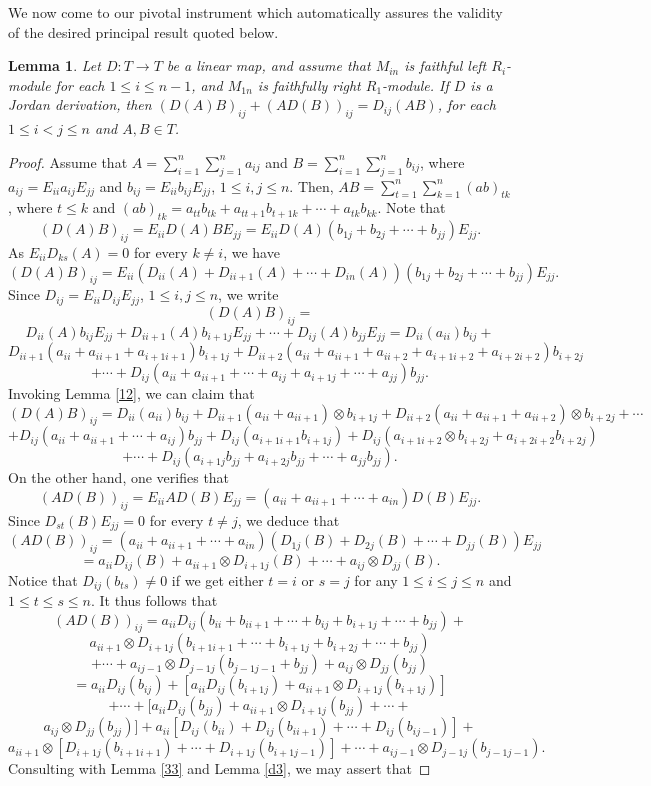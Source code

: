 \documentclass[12pt, reqno]{amsart}
\newtheorem{lemma}[theorem]{Lemma}
\theoremstyle{definition}
\numberwithin{equation}{section}
\begin{document}
We now come to our pivotal instrument which automatically assures the validity of the desired principal result quoted below.

\begin{lemma}\label{major} Let $D : T \longrightarrow T$ be a linear map, and assume that $M_{in}$ is faithful left $R_{i}$-module for each $1\leq i \leq n-1$, and $M_{1n}$ is faithfully right $R_1$-module. If $D$ is a Jordan derivation, then $(D(A)B)_{ij}+(AD(B))_{ij}=D_{ij}(AB)$, for each $1\leq i< j \leq n$ and $A,B\in T$.
\end{lemma}

\begin{proof} Assume that $A=\sum_{i=1}^n\sum_{j=1}^n a_{ij} $ and $B=\sum_{i=1}^n\sum_{j=1}^n b_{ij}$, where $a_{ij}=E_{ii}a_{ij}E_{jj}$ and $b_{ij}=E_{ii}b_{ij}E_{jj}$, $1\leq i,j\leq n$. Then, $AB=\sum_{t=1}^n\sum_{k=1}^n (ab)_{tk} $, where $t\leq k$ and $(ab)_{tk}=a_{tt}b_{tk}+a_{tt+1}b_{t+1k}+\cdots+a_{tk}b_{kk}$. Note that $$(D(A)B)_{ij}=E_{ii}D(A)BE_{jj}=E_{ii}D(A)(b_{1j}+b_{2j}+\cdots+b_{jj})E_{jj}.$$ As $E_{ii}D_{ks}(A)=0$ for every $k\neq i$, we have $$(D(A)B)_{ij}= E_{ii}(D_{ii}(A)+D_{ii+1}(A)+\cdots+D_{in}(A))(b_{1j}+b_{2j}+\cdots+b_{jj})E_{jj}.$$ Since $D_{ij}=E_{ii}D_{ij}E_{jj}$, $1\leq i,j\leq n$, we write $$(D(A)B)_{ij}= $$$$D_{ii}(A)b_{ij}E_{jj}+D_{ii+1}(A)b_{i+1j}E_{jj}+\cdots +D_{ij}(A)b_{jj}E_{jj}=D_{ii}( a_{ii})b_{ij}+$$
$$D_{ii+1}(a_{ii}+a_{ii+1}+ a_{i+1i+1} )b_{i+1j} +D_{ii+2}(a_{ii}+a_{ii+1}+ a_{ii+2}+a_{i+1i+2}+a_{i+2i+2} )b_{i+2j}$$$$+\cdots+D_{ij}( a_{ii} +a_{ii+1} +\cdots+a_{ij} + a_{i+1j}  +\cdots+ a_{jj} )b_{jj} .$$ Invoking Lemma \ref{12}, we can claim that $$(D(A)B)_{ij}=D_{ii}(a_{ii})  b_{ij}+D_{ii+1}(a_{ii}+a_{ii+1} )\otimes b_{i+1j}+D_{ii+2}(a_{ii}+a_{ii+1}+a_{ii+2})\otimes b_{i+2j}+\cdots$$$$+D_{ij}(a_{ii}+a_{ii+1}+\cdots+a_{ij} )b_{jj}+D_{ij}(a_{i+1i+1}  b_{i+1j})+D_{ij}(a_{i+1i+2}\otimes b_{i+2j}+a_{i+2i+2} b_{i+2j})$$$$+\cdots +D_{ij}(a_{i+1j}b_{jj}+a_{i+2j}b_{jj}+\cdots+a_{jj}b_{jj}).$$ On the other hand, one verifies that
$$(AD(B))_{ij}=E_{ii}AD(B)E_{jj}=(a_{ii}+a_{ii+1}+\cdots+a_{in})D(B)E_{jj}.$$ Since $D_{st}(B)E_{jj}=0$ for every $t\neq j$, we deduce that $$(AD(B))_{ij}=(a_{ii}+a_{ii+1}+\cdots+a_{in})(D_{1j}(B)+D_{2j}(B)+\cdots+D_{jj}(B))E_{jj}$$$$=a_{ii}D_{ij}(B)+a_{ii+1}\otimes D_{i+1j}(B)+\cdots+a_{ij}\otimes D_{jj}(B).$$ Notice that $D_{ij}(b_{ts})\neq 0$ if we get either $t=i$ or $s=j$ for any $1\leq i\leq j\leq n$ and $1\leq t\leq s\leq n$. It thus follows that
$$(AD(B))_{ij}=a_{ii}D_{ij}(b_{ii}+b_{ii+1}+\cdots+b_{ij}+b_{i+1j}+\cdots+b_{jj})+$$$$a_{ii+1}\otimes D_{i+1j}(b_{i+1i+1}+\cdots+b_{i+1j}+b_{i+2j}+\cdots+b_{jj})$$$$+\cdots+a_{ij-1}\otimes D_{j-1j}(b_{j-1j-1}+b_{jj})+a_{ij}\otimes D_{jj}(b_{jj})$$$$=a_{ii}  D_{ij}(b_{ij})+[a_{ii}  D_{ij}(b_{i+1j})+a_{ii+1}\otimes D_{i+1j}(b_{i+1j})]$$$$+\cdots+[a_{ii}  D_{ij}(b_{jj})+a_{ii+1}\otimes D_{i+1j}(b_{jj})+\cdots+$$$$a_{ij}\otimes D_{jj}(b_{jj})]+a_{ii}[D_{ij}(b_{ii})+D_{ij}(b_{ii+1})+\cdots+D_{ij}(b_{ij-1})]+$$$$a_{ii+1}\otimes[D_{i+1j}(b_{i+1i+1})+\cdots+D_{i+1j}(b_{i+1j-1})]+\cdots+ a_{ij-1}\otimes D_{j-1j}(b_{j-1j-1}).$$ Consulting with Lemma \ref{33} and Lemma \ref{d3}, we may assert that


\end{proof}
\end{document}
